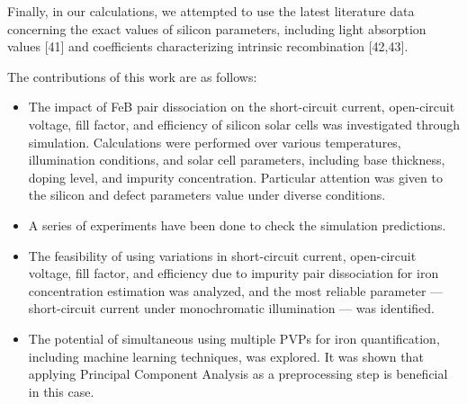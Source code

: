 \documentclass[a4paper,fleqn]{cas-sc}
\begin{document}
\begin{mdframed}
Finally, in our calculations, we attempted to use the latest literature data
concerning the exact values of silicon parameters, including light absorption values [41]
and coefficients characterizing intrinsic recombination [42,43].

\textcolor[rgb]{1.00,0.07,0.00}{
The contributions of this work are as follows:
\begin{itemize}[itemsep=2pt, parsep=0pt, topsep=0pt]
    \item The impact of FeB pair dissociation on the short-circuit current, open-circuit voltage, fill factor,
and efficiency of silicon solar cells was investigated through simulation.
Calculations were performed over various temperatures, illumination conditions, and solar cell parameters,
including base thickness, doping level, and impurity concentration.
Particular attention was given to the silicon and defect parameters value under diverse conditions.
    \item A series of experiments have been done to check the simulation predictions.
    \item The feasibility of using variations in short-circuit current, open-circuit voltage, fill factor,
and efficiency due to impurity pair dissociation for iron concentration estimation was analyzed,
and the most reliable parameter --- short-circuit current under monochromatic illumination --- was identified.
    \item The potential of simultaneous using multiple PVPs for iron quantification, including machine learning techniques, was explored.
It was shown that applying Principal Component Analysis as a preprocessing step is beneficial in this case.
\end{itemize}
}
\end{mdframed}
\end{document}
